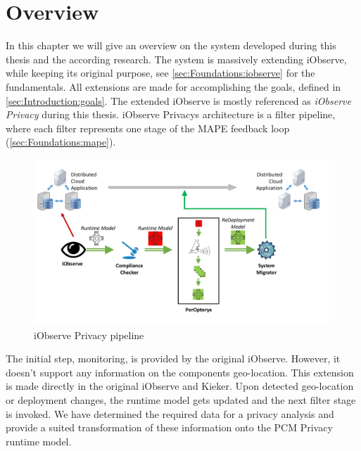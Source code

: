
\chapter{Overview}
\label{ch:Overview}

In this chapter we will give an overview on the system developed during this thesis and the according research. The system is massively extending iObserve, while keeping its original purpose, see \autoref{sec:Foundations:iobserve} for the fundamentals. All extensions are made for accomplishing the goals, defined in \autoref{sec:Introduction:goals}. The extended iObserve is mostly referenced as \textit{iObserve Privacy} during this thesis. iObserve Privacys architecture is a filter pipeline, where each filter represents one stage of the MAPE feedback loop (\autoref{sec:Foundations:mape}).


\begin{figure}[h]
	\centering
	\includegraphics[width=0.99\textwidth]{pictures/pipeline}
	\caption{iObserve Privacy pipeline}
	\label{fig:pipeline}
\end{figure}

The initial step, monitoring, is provided by the original iObserve. However, it doesn't support any information on the components geo-location. This extension is made directly in the original iObserve and Kieker. Upon detected geo-location or deployment changes, the runtime model gets updated and the next filter stage is invoked. We have determined the required data for a privacy analysis and provide a suited transformation of these information onto the PCM Privacy runtime model.


